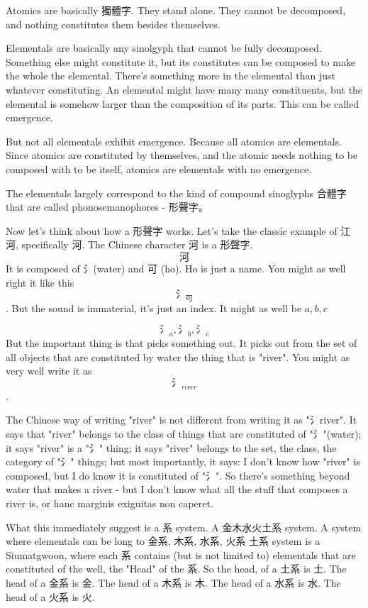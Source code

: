 Atomics are basically 獨體字. They stand alone. They cannot be decomposed, and nothing constitutes them besides themselves.

Elementals are basically any sinolgyph that cannot be fully decomposed. Something else might constitute it, but its constitutes can be composed to make the whole the elemental. There's something more in the elemental than just whatever constituting. An elemental might have many many constituents, but the elemental is somehow larger than the composition of its parts. This can be called emergence. 

But not all elementals exhibit emergence. Because all atomics are elementals. Since atomics are constituted by themselves, and the atomic needs nothing to be composed with to be itself, atomics are elementals with no emergence. 


The elementals largely correspond to the kind of compound sinoglyphs 合體字 that are called phonosemanophores - 形聲字。 

Now let's think about how a 形聲字 works. Let's take the classic example of 江河, specifically 河. The Chinese character 河 is a 形聲字. 
$$\text{河}$$
It is composed of 氵(water) and 可 (ho). Ho is just a name. You might as well right it like this $$\text{氵}_{\text{可}}$$. But the sound is immaterial, it's just an index. It might as well be $a,b,c$

$$\text{氵}_{a},\text{氵}_b,\text{氵}_c$$
But the important thing is that picks something out. It picks out from the set of all objects that are constituted by water the thing that is "river". You might as very well write it as $$\text{氵}_{river}$$. 

The Chinese way of writing "river" is not different from writing it as "氵river". It says that "river" belongs to the class of things that are constituted of "氵"(water); it says "river" is a "氵" thing; it says "river" belongs to the set, the class, the category of "氵" things; but most importantly, it says: I don't know how "river" is composed, but I do know it is constituted of "氵". So there's something beyond water that makes a river - but I don't know what all the stuff that composes a river is, or hanc marginis exiguitas non caperet.

What this immediately suggest is a 系 system. A 金木水火土系 system. A system where elementals can be long to 金系, 木系, 水系, 火系 土系 system is a Siumatgwoon, where each 系 contains (but is not limited to) elementals that are constituted of the well, the "Head" of the 系. So the head, of a 土系 is 土. The head of a 金系 is 金. The head of a 木系 is 木. The head of a 水系 is 水. The head of a 火系 is 火. 

